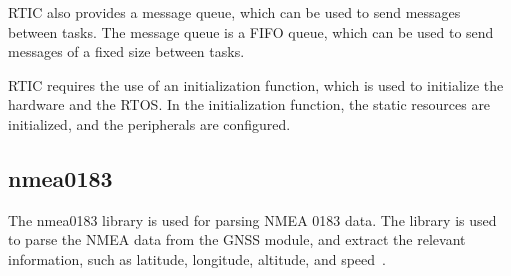 RTIC also provides a message queue, which can be used to send messages between tasks.
The message queue is a FIFO queue, which can be used to send messages of a fixed size between tasks.

RTIC requires the use of an initialization function, which is used to initialize the hardware and the RTOS.
In the initialization function, the static resources are initialized, and the peripherals are configured.
\subsection{nmea0183}
The nmea0183 library is used for parsing NMEA 0183 data.
The library is used to parse the NMEA data from the GNSS module, and extract the relevant information, such as latitude, longitude, altitude, and speed~\cite{nema0183}.

